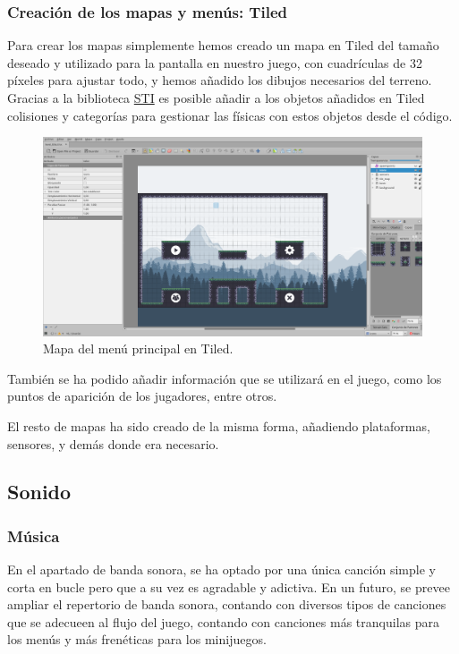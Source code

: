\documentclass[12pt, spanish]{article}
\begin{document}
\subsubsection{Creación de los mapas y menús: Tiled}

Para crear los mapas simplemente hemos creado un mapa en Tiled del tamaño deseado y utilizado para la pantalla en nuestro juego, con cuadrículas de 32 píxeles para ajustar todo, y hemos añadido los dibujos necesarios del terreno. Gracias a la biblioteca \href{https://github.com/karai17/Simple-Tiled-Implementation}{STI} es posible añadir a los objetos añadidos en Tiled colisiones y categorías para gestionar las físicas con estos objetos desde el código.

\begin{figure}[H]
	\centering
	\includegraphics[width=\textwidth]{"mapa_menu_principal.png"}
	\caption{Mapa del menú principal en Tiled.}\label{figure:mapa_menu_principal}
\end{figure}

También se ha podido añadir información que se utilizará en el juego, como los puntos de aparición de los jugadores, entre otros.

El resto de mapas ha sido creado de la misma forma, añadiendo plataformas, sensores, y demás donde era necesario.


\subsection{Sonido}

\subsubsection{Música}

En el apartado de banda sonora, se ha optado por una única canción simple y corta en bucle pero que a su vez es agradable y adictiva. En un futuro, se prevee ampliar el repertorio de banda sonora, contando con diversos tipos de canciones que se adecueen al flujo del juego, contando con canciones más tranquilas para los menús y más frenéticas para los minijuegos.
\end{document}
